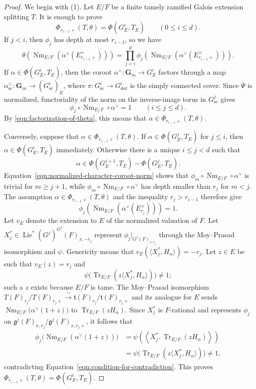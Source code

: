\documentclass[reqno]{amsart}
\numberwithin{equation}{subsection}
\newcommand{\G}{\mathbf{G}}
\newcommand{\mf}[1]{\mathfrak{#1}}
\newcommand{\co}{\colon}
\newcommand\frt{\mathfrak{t}}
\DeclareMathOperator{\Tr}{Tr}
\DeclareMathOperator{\Nm}{Nm}
\DeclareMathOperator{\Lie}{Lie}
\DeclareMathOperator{\der}{der}
\theoremstyle{remark}
\numberwithin{equation}{subsection}
\numberwithin{figure}{subsection}
\begin{document}
\begin{proof}
We begin with (1). Let $E/F$ be a finite tamely ramified Galois extension splitting $T$. It is enough to prove
\[
    \Phi_{r_{i-1}+}(T,\theta)=\Phi(G^i_E,T_E)
    \qquad(0\leq i\leq d).
\]
If $j < i$, then $\phi_j$ has depth at most $r_{i-1}$, so we have
\begin{equation}\label{eqn:factorization-of-theta}
\theta(\Nm_{E/F}(\alpha^\vee(E_{r_{i-1}+}^\times))) = \prod_{j=i}^d\phi_j(\Nm_{E/F}(\alpha^\vee(E_{r_{i-1}+}^\times))).
\end{equation}
If $\alpha \in \Phi(G^i_E, T_E)$, then the coroot $\alpha^\vee\co \G_m \to G^i_E$ factors through a map $\alpha_{\mathrm{sc}}^\vee\co \G_m \to (G^i_{\mathrm{sc}})_E$, where $\pi\co G^i_{\mathrm{sc}} \to G^i_{\der}$ is the simply connected cover. Since $\Psi$ is normalized, functoriality of the norm on the inverse-image torus in $G^j_{\mathrm{sc}}$ gives
\begin{equation}\label{eqn:normalized-character-coroot-norm}
\phi_j\circ \Nm_{E/F}\circ\alpha^\vee=1
\qquad(i\leq j\leq d).
\end{equation}
By \eqref{eqn:factorization-of-theta}, this means that $\alpha \in \Phi_{r_{i-1}+}(T, \theta)$.

Conversely, suppose that $\alpha\in\Phi_{r_{i-1}+}(T,\theta)$. If $\alpha\in\Phi(G^j_E,T_E)$ for $j \leq i$, then $\alpha\in\Phi(G^i_E,T_E)$ immediately. Otherwise there is a unique $i\leq j<d$ such that
\[
\alpha\in\Phi(G^{j+1}_E,T_E) - \Phi(G^j_E,T_E).
\]
Equation~\eqref{eqn:normalized-character-coroot-norm} shows that $\phi_m\circ \Nm_{E/F}\circ\alpha^\vee$ is trivial for $m\geq j+1$, while $\phi_m\circ \Nm_{E/F}\circ\alpha^\vee$ has depth smaller than $r_j$ for $m < j$. The assumption $\alpha\in\Phi_{r_{i-1}+}(T,\theta)$ and the inequality $r_j>r_{i-1}$ therefore give
\begin{equation}\label{eqn:condition-for-contradiction}
\phi_j(\Nm_{E/F}(\alpha^\vee(E_{r_j}^\times))) = 1.
\end{equation}
Let $v_E$ denote the extension to $E$ of the normalized valuation of $F$. Let $X_j^*\in\Lie^*(G^j)^{G^j}(F)_{x,-r_j}$ represent $\phi_j|_{G^j(F)_{x,r_j}}$ through the Moy--Prasad isomorphism and $\psi$. Genericity means that $v_E(\langle X_j^*,H_\alpha\rangle)=-r_j$. Let $z \in E$ be such that $v_E(z) = r_j$ and
\[
\psi\bigl(\Tr_{E/F}(z\langle X_j^*,H_\alpha\rangle)\bigr)\neq1;
\]
such a $z$ exists because $E/F$ is tame. The Moy--Prasad isomorphism $
T(F)_{r_j}/T(F)_{r_j+}
    \xrightarrow{\ \sim\ }
\frt(F)_{r_j}/\frt(F)_{r_j+}$ and its analogue for $E$ sends $\Nm_{E/F}\bigl(\alpha^\vee(1+z)\bigr)$ to $\Tr_{E/F}(zH_\alpha)$. Since $X_j^*$ is $F$-rational and represents $\phi_j$ on $\mf{g}^j(F)_{x,r_j}/\mf{g}^j(F)_{x,r_j+}$, it follows that
\[
\begin{aligned}
\phi_j\bigl(\Nm_{E/F}(\alpha^\vee(1+z))\bigr)
    &=\psi\left(\left\langle X_j^*,
    \Tr_{E/F}(zH_\alpha)\right\rangle\right)\\
    &=\psi\bigl(\Tr_{E/F}(z\langle X_j^*,H_\alpha\rangle)\bigr)\neq1,
\end{aligned}
\]
contradicting Equation~\eqref{eqn:condition-for-contradiction}. This proves $\Phi_{r_{i-1}+}(T,\theta)=\Phi(G^i_E,T_E)$.


\end{proof}
\end{document}
